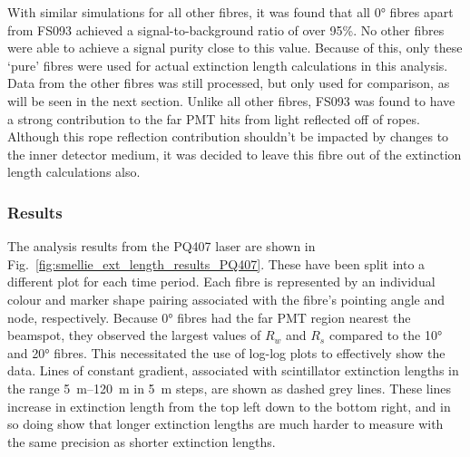 With similar simulations for all other fibres, it was found that all \ang{0} fibres apart from FS093 achieved a signal-to-background ratio of over 95\%. No other fibres were able to achieve a signal purity close to this value. Because of this, only these `pure' fibres were used for actual extinction length calculations in this analysis. Data from the other fibres was still processed, but only used for comparison, as will be seen in the next section. Unlike all other fibres, FS093 was found to have a strong contribution to the far PMT hits from light reflected off of ropes. Although this rope reflection contribution shouldn't be impacted by changes to the inner detector medium, it was decided to leave this fibre out of the extinction length calculations also.

\begin{figure}
    \centering
    \caption[]{}
    \label{fig:smellie_PQ407_FS107_far_pmts_components}
\end{figure}

\subsubsection{Results}\label{sec:smellie_ext_length_results}
The analysis results from the PQ407 laser are shown in Fig.~\ref{fig:smellie_ext_length_results_PQ407}. These have been split into a different plot for each time period. Each fibre is represented by an individual colour and marker shape pairing associated with the fibre's pointing angle and node, respectively. Because \ang{0} fibres had the far PMT region nearest the beamspot, they observed the largest values of $R_{w}$ and $R_{s}$ compared to the \ang{10} and \ang{20} fibres. This necessitated the use of log-log plots to effectively show the data. Lines of constant gradient, associated with scintillator extinction lengths in the range \SIrange{5}{120}{\m} in \SI{5}{\m} steps, are shown as dashed grey lines. These lines increase in extinction length from the top left down to the bottom right, and in so doing show that longer extinction lengths are much harder to measure with the same precision as shorter extinction lengths.

